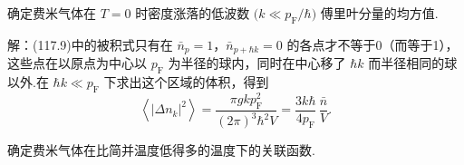 \begin{xiti}

\quad 确定费米气体在 $T=0$ 时密度涨落的低波数
$\bigl(k\ll p_{\mathrm F}/\hbar\bigr)$ 傅里叶分量的均方值.

解：(117.9)中的被积式只有在 $\bar{n}_{p}=1$，$\bar{n}_{p+\hbar k}=0$ 的各点才不等于0（而等于1），这些点在以原点为中心以 $p_{\mathrm F}$ 为半径的球内，同时在中心移了
$\hbar k$ 而半径相同的球以外.在 $\hbar k\ll p_{\mathrm F}$ 下求出这个区域的体积，得到
\begin{equation*}
  \left\langle|\Delta n_{k}|^{2}\right\rangle
  =\frac{\pi gkp^{2}_{\mathrm F}}{(2\pi)^{3}\hbar^{2}V}
  =\frac{3k\hbar}{4p_{\mathrm F}}\,\frac{\bar{n}}{V}.
\end{equation*}

\quad 确定费米气体在比简并温度低得多的温度下的关联函数.


\end{xiti}
